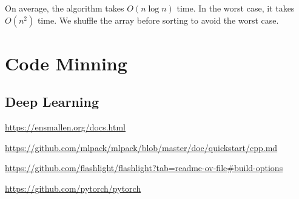 On average, the algorithm takes $O\left(n\log n\right)$ time. In the worst case, it takes $O\left(n^2\right)$ time.
We shuffle the array before sorting to avoid the worst case.

\section{Code Minning}

\subsection{Deep Learning}

\url{https://ensmallen.org/docs.html}

\url{https://github.com/mlpack/mlpack/blob/master/doc/quickstart/cpp.md}

\url{https://github.com/flashlight/flashlight?tab=readme-ov-file#build-options}

\url{https://github.com/pytorch/pytorch}
